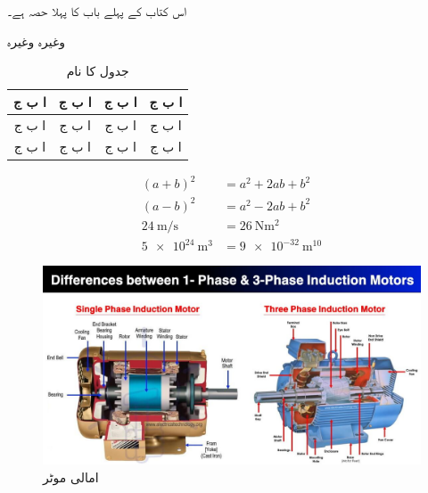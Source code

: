 \documentclass[leqno, b5paper]{khalid-urdu-book}
\begin{document}
اس کتاب کے پہلے باب کا پہلا حصہ ہے۔

وغیرہ وغیرہ





\begin{table}[h!]
	\centering
	\begin{tabular}{|c|c|c c|} %
		\hline %
		ا ب ج & ا ب ج & ا ب ج & ا ب ج\\ %
		\hline\hline
		ا ب ج & ا ب ج & ا ب ج & ا ب ج\\
		\hline
		ا ب ج & ا ب ج & ا ب ج & ا ب ج\\
		\hline
	\end{tabular}
\caption{جدول کا نام} %
\label{tab:my_label}
\end{table}

\begin{align} %
	(a+b)^{2} &= a^{2}+2ab+b^{2}\\ %
	(a-b)^{2} &= a^{2}-2ab+b^{2}\\
	\SI{24}{\meter\per\second} &= \SI{26}{\newton\meter\squared}\\
	\SI{5e24}{\meter\cubed} &= \SI{9e-32}{\meter\tothe{10}}
\end{align}
\begin{figure}
	\centering
	\includegraphics[width=\linewidth]{Induction Motor}
	\caption{امالی موٹر}
	\label{for reference}
\end{figure}
\end{document}
